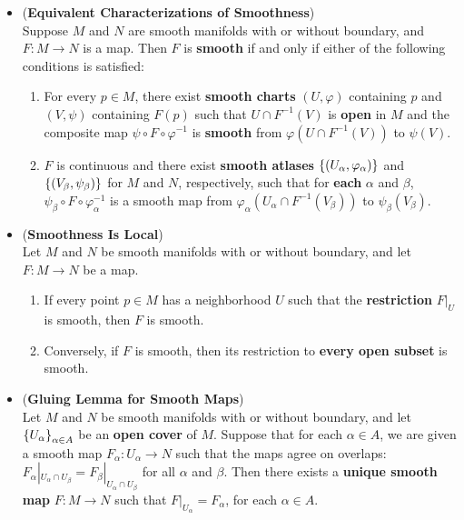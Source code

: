 \documentclass[11pt]{article}
\begin{document}
\begin{itemize}
\item 
\begin{proposition} (\textbf{Equivalent Characterizations of Smoothness}) \citep{lee2003introduction}\\
Suppose $M$ and $N$ are smooth manifolds with or without boundary, and $F: M \rightarrow N$ is a map. Then $F$ is \textbf{smooth} if and only if either of the following conditions is satisfied:
\begin{enumerate}
\item For every $p \in M$, there exist \textbf{smooth charts} $(U, \varphi)$ containing $p$ and $(V, \psi)$ containing $F(p)$ such that $U \cap F^{-1}(V)$ is \textbf{open} in $M$ and the composite map $\psi \circ F \circ \varphi^{-1}$ is \textbf{smooth} from $\varphi(U\cap F^{-1}(V))$ to $\psi(V)$.
\item $F$ is continuous and there exist \textbf{smooth atlases} $\left\{(U_{\alpha}, \varphi_{\alpha})\right\}$ and $\left\{(V_{\beta}, \psi_{\beta})\right\}$ for $M$ and $N$, respectively, such that for \textbf{each} $\alpha$ and $\beta$, $\psi_{\beta} \circ F \circ \varphi_{\alpha}^{-1}$ is a smooth map from $\varphi_{\alpha}(U_{\alpha}\cap F^{-1}(V_{\beta}))$ to $\psi_{\beta}(V_{\beta})$.
\end{enumerate}
\end{proposition}

\item
\begin{proposition} (\textbf{Smoothness Is Local}) \citep{lee2003introduction}\\
Let $M$ and $N$ be smooth manifolds with or without boundary, and let $F: M \rightarrow N$ be a map.
\begin{enumerate}
\item If every point $p \in M$ has a neighborhood $U$ such that the \textbf{restriction} $F|_{U}$ is smooth, then $F$ is smooth.
\item Conversely, if $F$ is smooth, then its restriction to \textbf{every open subset} is smooth.
\end{enumerate} 
\end{proposition}

\item \begin{corollary} (\textbf{Gluing Lemma for Smooth Maps}) \citep{lee2003introduction}\\
 Let $M$ and $N$ be smooth manifolds with or without boundary, and let $\left\{U_{\alpha}\right\}_{\alpha \in A}$ be an \textbf{open cover} of $M$. Suppose that for each $\alpha \in A$, we are given a smooth map $F_{\alpha}: U_{\alpha} \rightarrow N$ such that the maps agree on overlaps: $F_{\alpha}|_{U_{\alpha}\cap U_{\beta}} = F_{\beta}|_{U_{\alpha}\cap U_{\beta}}$ for all $\alpha$ and $\beta$. Then there exists a \textbf{unique smooth map} $F: M \rightarrow N$ such that $F|_{U_{\alpha}} = F_{\alpha}$, for each $\alpha \in A$.
\end{corollary}


\end{itemize}
\end{document}
